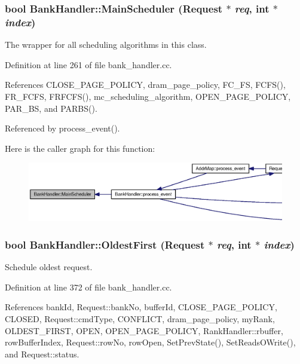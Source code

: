 \subsubsection[{MainScheduler}]{\setlength{\rightskip}{0pt plus 5cm}bool BankHandler::MainScheduler ({\bf Request} $\ast$ {\em req}, \/  int $\ast$ {\em index})}\label{classBankHandler_94d78e5801d1bba71f1ddb5405212d6c}


The wrapper for all scheduling algorithms in this class. 



Definition at line 261 of file bank\_\-handler.cc.

References CLOSE\_\-PAGE\_\-POLICY, dram\_\-page\_\-policy, FC\_\-FS, FCFS(), FR\_\-FCFS, FRFCFS(), mc\_\-scheduling\_\-algorithm, OPEN\_\-PAGE\_\-POLICY, PAR\_\-BS, and PARBS().

Referenced by process\_\-event().

Here is the caller graph for this function:\nopagebreak
\begin{figure}[H]
\begin{center}
\leavevmode
\includegraphics[width=420pt]{classBankHandler_94d78e5801d1bba71f1ddb5405212d6c_icgraph}
\end{center}
\end{figure}
\subsubsection[{OldestFirst}]{\setlength{\rightskip}{0pt plus 5cm}bool BankHandler::OldestFirst ({\bf Request} $\ast$ {\em req}, \/  int $\ast$ {\em index})}\label{classBankHandler_66cae2fc178c4ae45688198f4e02e8c8}


Schedule oldest request. 



Definition at line 372 of file bank\_\-handler.cc.

References bankId, Request::bankNo, bufferId, CLOSE\_\-PAGE\_\-POLICY, CLOSED, Request::cmdType, CONFLICT, dram\_\-page\_\-policy, myRank, OLDEST\_\-FIRST, OPEN, OPEN\_\-PAGE\_\-POLICY, RankHandler::rbuffer, rowBufferIndex, Request::rowNo, rowOpen, SetPrevState(), SetReadsOWrite(), and Request::status.

